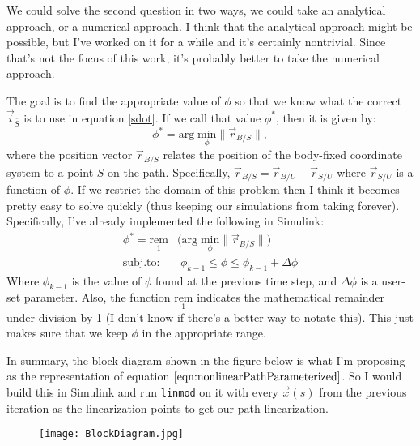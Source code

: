 \documentclass[12pt]{article}
\newcommand{\unitvec}[2]{\vec{#1}_{\overline{#2}}}
\begin{document}
We could solve the second question in two ways, we could take an analytical approach, or a numerical approach.  I think that the analytical approach might be possible, but I've worked on it for a while and it's certainly nontrivial.  Since that's not the focus of this work, it's probably better to take the numerical approach.

The goal is to find the appropriate value of $\phi$ so that we know what the correct $\unitvec{i}{S}$ is to use in equation \ref{sdot}.  If we call that value $\phi^*$, then it is given by:
\begin{equation}
\phi^* = \mathrm{arg}\; \underset{\phi}{\mathrm{min}} \| \vec{r}_{B/S}\|,
\end{equation}
where the position vector $\vec{r}_{B/S}$ relates the position of the body-fixed coordinate system to a point $S$ on the path.  Specifically, $\vec{r}_{B/S} = \vec{r}_{B/U}-\vec{r}_{S/U}$ where $\vec{r}_{S/U}$ is a function of $\phi$.  If we restrict the domain of this problem then I think it becomes pretty easy to solve quickly (thus keeping our simulations from taking forever).  Specifically, I've already implemented the following in Simulink:
\begin{equation}
\begin{split}
\phi^* = \underset{1}{\mathrm{rem}}&\bigg(\mathrm{arg}\; \underset{\phi}{\mathrm{min}}  \| \vec{r}_{B/S} \| \bigg)\\
\mathrm{subj. to: }  &\;\phi_{k-1}\leq\phi\leq\phi_{k-1}+\Delta\phi
\end{split}
\end{equation}
Where $\phi_{k-1}$ is the value of $\phi$ found at the previous time step, and $\Delta\phi$ is a user-set parameter.  Also, the function $\underset{1}{\mathrm{rem}}$ indicates the mathematical remainder under division by 1 (I don't know if there's a better way to notate this).  This just makes sure that we keep $\phi$ in the appropriate range.

In summary, the block diagram shown in the figure below is what I'm proposing as the representation of equation $\ref{eqn:nonlinearPathParameterized}$.  So I would build this in Simulink and run \texttt{linmod} on it with every $\vec{x}(s)$ from the previous iteration as the linearization points to get our path linearization.

\begin{figure}[H]
	\texttt{[image: BlockDiagram.jpg]}
\end{figure}
\end{document}
